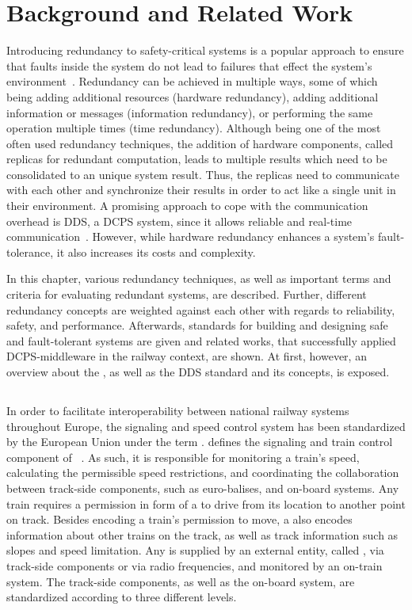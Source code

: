 \chapter{Background and Related Work}
\label{chptr:concepts}

Introducing redundancy to safety-critical systems is a popular approach to ensure that faults inside the system do not lead to failures that effect the system's environment~\cite{BarryFaultToleranceAnalysis}.
Redundancy can be achieved in multiple ways, some of which being adding additional resources (hardware redundancy), adding additional information or messages (information redundancy), or performing the same operation multiple times (time redundancy).
Although being one of the most often used redundancy techniques, the addition of hardware components, called replicas for redundant computation, leads to multiple results which need to be consolidated to an unique system result.
Thus, the replicas need to communicate with each other and synchronize their results in order to act like a single unit in their environment.
A promising approach to cope with the communication overhead is \gls*{DDS}, a \gls*{DCPS} system, since it allows reliable and real-time communication~\cite{omgDDSspec}.
However, while hardware redundancy enhances a system's fault-tolerance, it also increases its costs and complexity.

In this chapter, various redundancy techniques, as well as important terms and criteria for evaluating redundant systems, are described.
Further, different redundancy concepts are weighted against each other with regards to reliability, safety, and performance.
Afterwards, standards for building and designing safe and fault-tolerant systems are given and related works, that successfully applied \gls*{DCPS}-middleware in the railway context, are shown.
At first, however, an overview about the , as well as the \gls*{DDS} standard and its concepts, is exposed.

\section{}
In order to facilitate interoperability between national railway systems throughout Europe, the signaling and speed control system has been standardized by the European Union under the term .
 defines the signaling and train control component of ~\cite{ETCS26}.
As such, it is responsible for monitoring a train's speed, calculating the permissible speed restrictions, and coordinating the collaboration between track-side components, such as  euro-balises, and on-board systems.
Any train requires a permission in form of a  to drive from its location to another point on track.
Besides encoding a train's permission to move, a  also encodes information about other trains on the track, as well as track information such as slopes and speed limitation.
Any  is supplied by an external entity, called , via track-side components or via radio frequencies, and monitored by an on-train system.
The track-side components, as well as the on-board system, are standardized according to three different  levels.

